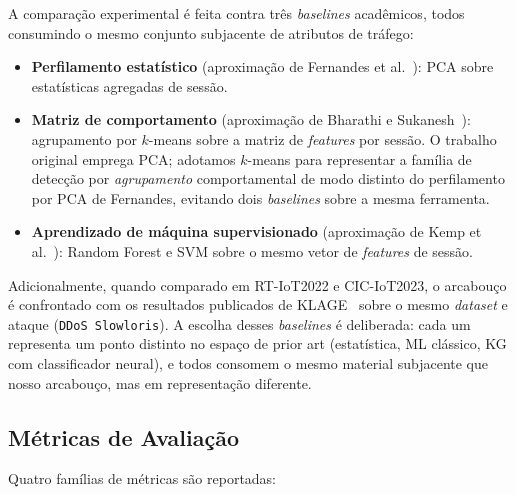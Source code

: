 \documentclass[preprint,12pt]{elsarticle}
\begin{document}
A comparação experimental é feita contra três \emph{baselines} acadêmicos, todos consumindo o mesmo conjunto subjacente de atributos de tráfego:

\begin{itemize}
    \item \textbf{Perfilamento estatístico} (aproximação de Fernandes et al.~\cite{fernandes2015autonomous}): PCA sobre estatísticas agregadas de sessão.
    \item \textbf{Matriz de comportamento} (aproximação de Bharathi e Sukanesh~\cite{bharathi2012pca}): agrupamento por $k$-means sobre a matriz de \emph{features} por sessão. O trabalho original emprega PCA; adotamos $k$-means para representar a família de detecção por \emph{agrupamento} comportamental de modo distinto do perfilamento por PCA de Fernandes, evitando dois \emph{baselines} sobre a mesma ferramenta.
    \item \textbf{Aprendizado de máquina supervisionado} (aproximação de Kemp et al.~\cite{kemp2023approach}): Random Forest e SVM sobre o mesmo vetor de \emph{features} de sessão.
\end{itemize}

Adicionalmente, quando comparado em RT-IoT2022 e CIC-IoT2023, o arcabouço é confrontado com os resultados publicados de KLAGE~\cite{belcastro2025klage} sobre o mesmo \emph{dataset} e ataque (\texttt{DDoS Slowloris}). A escolha desses \emph{baselines} é deliberada: cada um representa um ponto distinto no espaço de prior art (estatística, ML clássico, KG com classificador neural), e todos consomem o mesmo material subjacente que nosso arcabouço, mas em representação diferente.

\subsection{Métricas de Avaliação}

Quatro famílias de métricas são reportadas:
\end{document}
